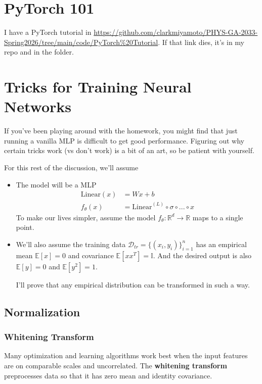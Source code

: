 \section{PyTorch 101}
I have a PyTorch tutorial in \url{https://github.com/clarkmiyamoto/PHYS-GA-2033-Spring2026/tree/main/code/PyTorch\%20Tutorial}. If that link dies, it's in my repo and in the  folder.


\section{Tricks for Training Neural Networks}

If you've been playing around with the homework, you might find that just running a vanilla MLP is difficult to get good performance. Figuring out why certain tricks work (vs don't work) is a bit of an art, so be patient with yourself.

For this rest of the discussion, we'll assume 
\begin{itemize}
	\item The model will be a MLP
	\begin{align}
		\text{Linear}(x) & = W x + b\\
		f_\theta(x) & = \text{Linear}^{(L)} \circ \sigma \circ ... \circ x
	\end{align}
	To make our lives simpler, assume the model $f_\theta: \mathbb R^d \to \mathbb R$ maps to a single point.
	\item We'll also assume the training data $\mathcal D_{tr} = \{(x_i, y_i)\}_{i=1}^n$ has an empirical mean $\mathbb E[x] = 0$ and covariance $\mathbb E[xx^T] = \mathbb I$. And the desired output is also $\mathbb E[y] = 0$ and $\mathbb E[y^2] = 1$.
	
	I'll prove that any empirical distribution can be transformed in such a way.
\end{itemize}


\subsection{Normalization}

\subsubsection{Whitening Transform}

Many optimization and learning algorithms work best when the input features are on comparable scales and uncorrelated.
The \textbf{whitening transform} preprocesses data so that it has zero mean and identity covariance.


